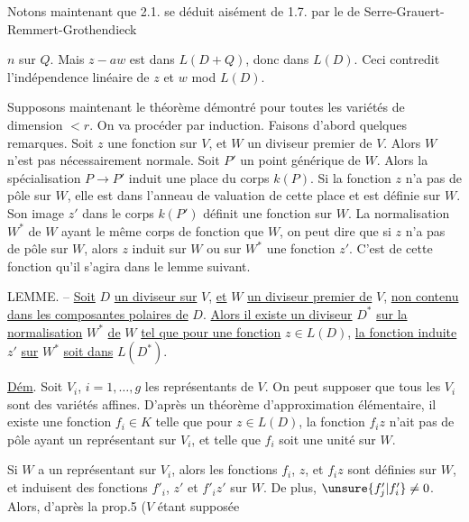 Notons maintenant que 2.1.  se déduit aisément de 1.7. par le  de Serre-Grauert-Remmert-Grothendieck


$n$ sur $Q$. Mais $z-aw$ est dans $L(D+Q)$, donc dans $L(D)$. Ceci contredit l'indépendence linéaire de $z$ et $w$ mod $L(D)$.

Supposons maintenant le théorème démontré pour toutes les variétés de dimension $<r$. On va procéder par induction. Faisons d'abord quelques remarques. Soit $z$ une fonction sur $V$, et $W$ un diviseur premier de $V$. Alors $W$ n'est pas nécessairement normale. Soit $P'$ un point générique de $W$. Alors la spécialisation $P\longrightarrow P'$ induit une place du corps $k(P)$. Si la fonction $z$ n'a pas de pôle sur $W$, elle est dans l'anneau de valuation de cette place et est définie sur $W$. Son image $z'$ dans le corps $k(P')$ définit une fonction sur $W$. La normalisation $W^*$ de $W$ ayant le même corps de fonction que $W$, on peut dire que si $z$ n'a pas de pôle sur $W$, alors $z$ induit sur $W$ ou sur $W^*$ une fonction $z'$. C'est de cette fonction qu'il s'agira dans le lemme suivant.

LEMME. -- \uline{Soit} $D$ \uline{un diviseur sur} $V$, \uline{et} $W$ \uline{un diviseur premier de} $V$, \uline{non contenu dans les composantes polaires de} $D$. \uline{Alors il existe un diviseur} $D^*$ \uline{sur la normalisation} $W^*$ \uline{de} $W$ \uline{tel que pour une fonction} $z\in L(D)$, \uline{la fonction induite} $z'$ \uline{sur} $W^*$ \uline{soit dans} $L(D^*)$.

\uline{Dém}. Soit $V_i$, $i=1,\ldots,g$ les représentants de $V$. On peut supposer que tous les $V_i$ sont des variétés affines. D'après un théorème d'approximation élémentaire, il existe une fonction $f_i\in K$ telle que pour $z\in L(D)$, la fonction $f_i z$ n'ait pas de pôle ayant un représentant sur $V_i$, et telle que $f_i$ soit une unité sur $W$.

Si $W$ a un représentant sur $V_i$, alors les fonctions $f_i$, $z$, et $f_i z$ sont définies sur $W$, et induisent des fonctions $f'_i$, $z'$ et $f'_i z'$ sur $W$. De plus, $\unsure{f'_j|f'_i}\neq0$. Alors, d'après la prop.5 ($V$ étant supposée

